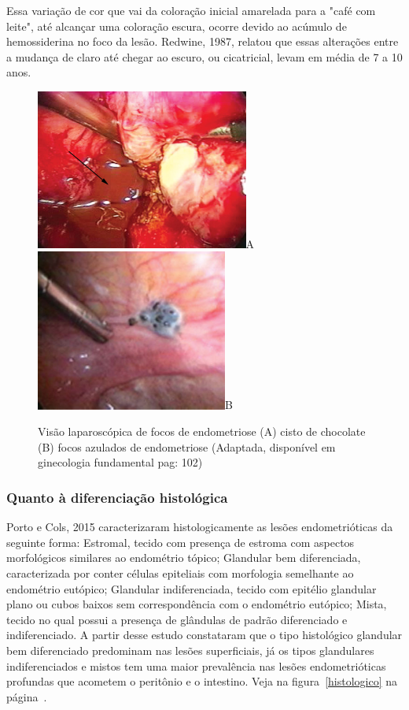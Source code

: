 \documentclass[12pt]{article} %
\begin{document}
Essa variação de cor que vai da coloração
inicial amarelada para a "café com leite", até alcançar uma coloração
escura, ocorre devido ao acúmulo de hemossiderina no
foco da lesão. Redwine, 1987, relatou que essas alterações entre a
mudança de claro até chegar ao escuro, ou cicatricial, levam em média
de 7 a 10 anos.


\begin{figure}[h!] 
\centering
\includegraphics[width=7cm]{cistodechocolate.png}A
\includegraphics[width=6.3cm]{focos2.png}B
\caption[Endometriose: visão laparoscópica] {Visão laparoscópica de focos de endometriose (A) cisto de chocolate (B) focos azulados de endometriose (Adaptada, disponível em ginecologia fundamental pag: 102)}
\label{implantes do endometrio}
\end{figure} 


\subsubsection{Quanto à diferenciação histológica}

Porto e Cols, 2015 caracterizaram histologicamente as lesões
endometrióticas da seguinte forma: Estromal, tecido com presença de
estroma com aspectos morfológicos similares ao endométrio tópico;
Glandular bem diferenciada, caracterizada por conter células
epiteliais com morfologia semelhante ao endométrio eutópico; Glandular
indiferenciada, tecido com epitélio glandular plano ou cubos baixos
sem correspondência com o endométrio eutópico; Mista, tecido no qual
possui a presença de glândulas de padrão diferenciado e
indiferenciado. A partir desse estudo constataram que o tipo
histológico glandular bem diferenciado predominam nas lesões
superficiais, já os tipos glandulares indiferenciados e mistos tem uma
maior prevalência nas lesões endometrióticas profundas que acometem o
peritônio e o intestino. Veja na figura~\ref{histologico} na
página~\pageref{histologico}.
\end{document}
